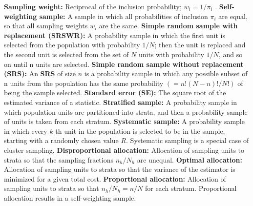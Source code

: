 \documentclass[a4paper,twoside,11pt]{article}
\begin{document}
\newline
\textbf{Sampling weight:} Reciprocal of the inclusion probability; $w_i = 1/\pi_i$ . 
\newline
\newline
\textbf{Self-weighting sample:} A sample in which all probabilities of inclusion $\pi_i$ are equal, so that all sampling weights $w_i$ are the same.
\newline
\newline
\textbf{Simple random sample with replacement (SRSWR):} A probability sample in which the first unit is selected from the population with probability $1/N$; then the unit is replaced and the second unit is selected from the set of $N$ units with probability $1/N$, and so on until n units are selected.
\newline
\newline
\textbf{Simple random sample without replacement (SRS):} An \textbf{SRS} of size $n$ is a probability sample in which any possible subset of n units from the population has the same probability $(= n!(N-n)!/N !)$ of being the sample selected.
\newline
\newline
\textbf{Standard error (SE):} The square root of the estimated variance of a statistic. 
\newline
\newline
\textbf{Stratified sample:} A probability sample in which population units are partitioned into strata, and then a probability sample of units is taken from each stratum.
\newline
\newline
\textbf{Systematic sample:} A probability sample in which every $k$ th unit in the population is selected to be in the sample, starting with a randomly chosen value $R$. Systematic sampling is a special case of cluster sampling.
\newline
\newline
\textbf{Disproportional allocation:} Allocation of sampling units to strata so that the sampling fractions $n_h/N_h$ are unequal.
\newline
\newline
\textbf{Optimal allocation:} Allocation of sampling units to strata so that the variance of the estimator is minimized for a given total cost.
\newline
\newline
\textbf{Proportional allocation:} Allocation of sampling units to strata so that $n_h/N_h =n/N$ for each stratum. Proportional allocation results in a self-weighting sample.
\end{document}
